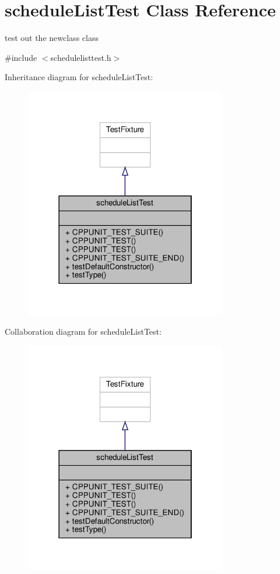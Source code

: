\hypertarget{classscheduleListTest}{}\section{schedule\+List\+Test Class Reference}
\label{classscheduleListTest}


test out the newclass class  




{\ttfamily \#include $<$schedulelisttest.\+h$>$}



Inheritance diagram for schedule\+List\+Test\+:\nopagebreak
\begin{figure}[H]
\begin{center}
\leavevmode
\includegraphics[width=250pt]{classscheduleListTest__inherit__graph}
\end{center}
\end{figure}


Collaboration diagram for schedule\+List\+Test\+:\nopagebreak
\begin{figure}[H]
\begin{center}
\leavevmode
\includegraphics[width=250pt]{classscheduleListTest__coll__graph}
\end{center}
\end{figure}
